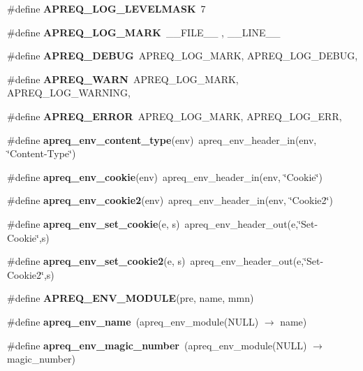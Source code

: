 \begin{CompactItemize}
\item 
{}
\#define {\bf APREQ\_\-LOG\_\-LEVELMASK}\ 7\label{apreq__env_8h_a8}

\item 
{}
\#define {\bf APREQ\_\-LOG\_\-MARK}\ \_\-\_\-FILE\_\-\_\- , \_\-\_\-LINE\_\-\_\-\label{apreq__env_8h_a9}

\item 
{}
\#define {\bf APREQ\_\-DEBUG}\ APREQ\_\-LOG\_\-MARK, APREQ\_\-LOG\_\-DEBUG,\label{apreq__env_8h_a10}

\item 
{}
\#define {\bf APREQ\_\-WARN}\ APREQ\_\-LOG\_\-MARK, APREQ\_\-LOG\_\-WARNING,\label{apreq__env_8h_a11}

\item 
{}
\#define {\bf APREQ\_\-ERROR}\ APREQ\_\-LOG\_\-MARK, APREQ\_\-LOG\_\-ERR,\label{apreq__env_8h_a12}

\item 
\#define {\bf apreq\_\-env\_\-content\_\-type}(env)\ apreq\_\-env\_\-header\_\-in(env, \char`\"{}Content-Type\char`\"{})
\item 
\#define {\bf apreq\_\-env\_\-cookie}(env)\ apreq\_\-env\_\-header\_\-in(env, \char`\"{}Cookie\char`\"{})
\item 
\#define {\bf apreq\_\-env\_\-cookie2}(env)\ apreq\_\-env\_\-header\_\-in(env, \char`\"{}Cookie2\char`\"{})
\item 
\#define {\bf apreq\_\-env\_\-set\_\-cookie}(e, s)\ apreq\_\-env\_\-header\_\-out(e,\char`\"{}Set-Cookie\char`\"{},s)
\item 
\#define {\bf apreq\_\-env\_\-set\_\-cookie2}(e, s)\ apreq\_\-env\_\-header\_\-out(e,\char`\"{}Set-Cookie2\char`\"{},s)
\item 
\#define {\bf APREQ\_\-ENV\_\-MODULE}(pre, name, mmn)
\item 
\#define {\bf apreq\_\-env\_\-name}\ (apreq\_\-env\_\-module(NULL) $\rightarrow$ name)
\item 
\#define {\bf apreq\_\-env\_\-magic\_\-number}\ (apreq\_\-env\_\-module(NULL) $\rightarrow$ magic\_\-number)
\end{CompactItemize}
